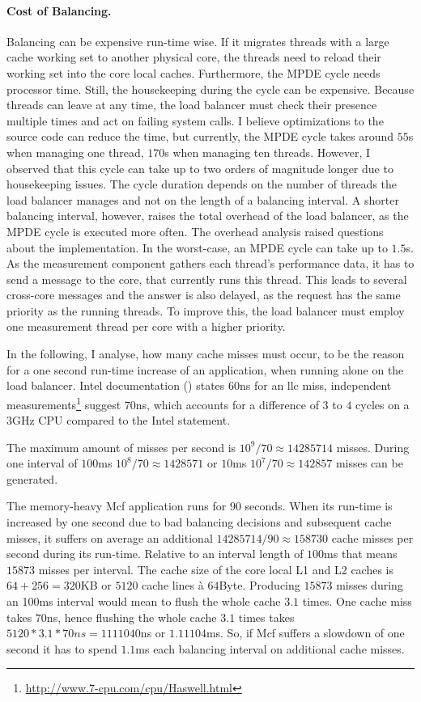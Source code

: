 \paragraph{Cost of Balancing.}
Balancing can be expensive run-time wise.
If it migrates threads with a large cache working set to another physical core,
the threads need to reload their working set into the core local caches.
Furthermore, the MPDE cycle needs processor time.
Still, the housekeeping during the cycle can be expensive.
Because threads can leave at any time, the load balancer must check their
presence multiple times and act on failing system calls.
I believe optimizations to the source code can reduce the time, but currently,
the MPDE cycle takes around $55$\textmu{}s when managing one thread,
$170$\textmu{}s when managing ten threads.
However, I observed that this cycle can take up to two orders of magnitude
longer due to housekeeping issues.
The cycle duration depends on the number of threads the load
balancer manages and not on the length of a balancing interval.
A shorter balancing interval, however, raises the total overhead of the load
balancer, as the MPDE cycle is executed more often.
The overhead analysis raised questions about the implementation.
In the worst-case, an MPDE cycle can take up to $1.5$s.
As the measurement component gathers each thread's performance data, it has to
send a message to the core, that currently runs this thread.
This leads to several cross-core messages and the answer is also delayed, as
the request has the same priority as the running threads.
To improve this, the load balancer must employ one measurement thread per core
with a higher priority.

In the following, I analyse, how many cache misses must occur, to be the reason
for a one second run-time increase of an application, when running alone on the load
balancer.
Intel documentation (\cite{intel_perf_analysis_2009}) states $60$ns for an
\gls{llc} miss, independent
measurements\footnote{\url{http://www.7-cpu.com/cpu/Haswell.html}}
suggest $70$ns, which accounts for a difference of $3$ to $4$ cycles on a $3$GHz CPU
compared to the Intel statement.

The maximum amount of misses per second is $10^9/70 \approx 14285714$ misses.
During one interval of $100$ms $10^8/70 \approx 1428571$ or $10$ms $10^7/70 \approx
142857$ misses can be generated.

The memory-heavy Mcf application runs for $90$ seconds.
When its run-time is increased by one second due to bad balancing decisions and
subsequent cache misses, it suffers on average an additional
$14285714 / 90 \approx 158730$ cache misses per second during its run-time.
Relative to an interval length of $100$ms that means $15873$ misses per interval.
The cache size of the core local L1 and L2 caches is $64 + 256 = 320$KB or
$5120$ cache lines \`a $64$Byte.
Producing $15873$ misses during an 100ms interval would mean to flush the
whole cache $3.1$ times.
One cache miss takes $70$ns, hence flushing the whole cache $3.1$ times takes
$5120 * 3.1 * 70ns = 1111040$ns or $1.11104$ms.
So, if Mcf suffers a slowdown of one second it has to spend $1.1$ms each balancing
interval on additional cache misses.

